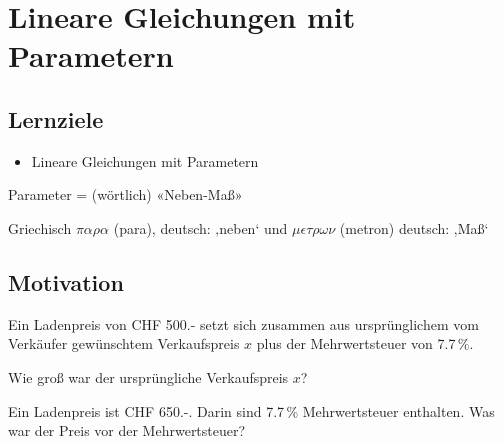 
\section{Lineare Gleichungen mit Parametern}
\subsection*{Lernziele}

\begin{itemize}
\item Lineare Gleichungen mit Parametern
\end{itemize}

Parameter = (wörtlich) «Neben-Maß»

Griechisch $\pi\alpha\rho\alpha$ (para), deutsch: ‚neben‘ und $\mu\epsilon\tau\rho\omega\nu$ (metron) deutsch: ‚Maß‘

\newpage
\subsection{Motivation}
Ein Ladenpreis von CHF 500.- setzt sich zusammen aus ursprünglichem
vom Verkäufer gewünschtem Verkaufspreis $x$ plus der Mehrwertsteuer von 7.7\,\%.

Wie groß war der ursprüngliche Verkaufspreis $x$?


Ein Ladenpreis ist CHF 650.-. Darin sind 7.7\,\% Mehrwertsteuer
enthalten. Was war der Preis vor der Mehrwertsteuer?


